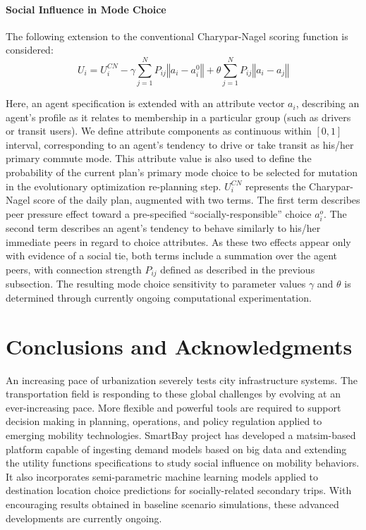 \paragraph{Social Influence in Mode Choice} 
The following extension to the conventional Charypar-Nagel scoring function is considered:
\begin{equation*}
U_i=U_i^{CN}-\gamma\sum_{j=1}^N P_{ij}\left\Vert a_i - a_i^0 \right\Vert +\theta \sum_{j=1}^N P_{ij} \left\Vert a_i - a_j \right\Vert
\end{equation*}

Here, an agent specification is extended with an attribute vector $a_i$, describing an agent's profile as it relates to membership in a particular group (such as drivers or transit users). We define attribute components as continuous within $\left[0, 1\right]$ interval, corresponding to an agent's tendency to drive or take transit as his/her primary commute mode. This attribute value is also used to define the probability of the current plan's primary mode choice to be selected for mutation in the evolutionary optimization re-planning step. $U_i^{CN}$ represents the Charypar-Nagel score of the daily plan, augmented with two terms. The first term describes peer pressure effect toward a pre-specified ``socially-responsible'' choice $a_i^o$. The second term describes an agent's tendency to behave similarly to his/her immediate peers in regard to choice attributes. As these two effects appear only with evidence of a social tie, both terms include a summation over the agent peers, with connection strength $P_{ij}$ defined as described in the previous subsection. The resulting mode choice sensitivity to parameter values $\gamma$ and $\theta$ is determined through currently ongoing computational experimentation.

\section{Conclusions and Acknowledgments}
An increasing pace of urbanization severely tests city infrastructure systems. The transportation field is responding to these global challenges by evolving at an ever-increasing pace. More flexible and powerful tools are required to support decision making in planning, operations, and policy regulation applied to emerging mobility technologies. SmartBay project has developed a \gls{matsim}-based platform capable of ingesting demand models based on big data and extending the utility functions specifications to study social influence on mobility behaviors. It also incorporates semi-parametric machine learning models applied to destination location choice predictions for socially-related secondary trips. With encouraging results obtained in baseline scenario simulations, these advanced developments are currently ongoing. 

